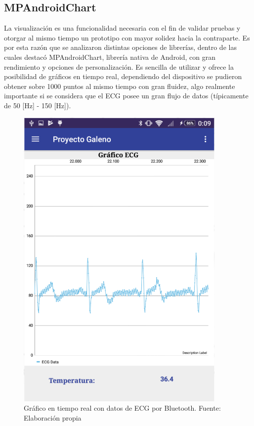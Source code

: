 \subsection{MPAndroidChart}

La visualización es una funcionalidad necesaria con el fin de validar pruebas y otorgar al mismo tiempo un prototipo con mayor solidez hacia la contraparte. Es por esta razón que se analizaron distintas opciones de librerías, dentro de las cuales destacó MPAndroidChart, librería nativa de Android, con gran rendimiento y opciones de personalización. Es sencilla de utilizar y ofrece la posibilidad de gráficos en tiempo real, dependiendo del dispositivo se pudieron obtener sobre 1000 puntos al mismo tiempo con gran fluidez, algo realmente importante si se considera que el ECG posee un gran flujo de datos (típicamente de 50 [Hz] - 150 [Hz]).

\begin{figure}[H]
	\centering
	\includegraphics[scale=1]{figuras/proto1/graph.png}
	\caption{Gráfico en tiempo real con datos de ECG por Bluetooth. Fuente: Elaboración propia}
	\label{graph}
\end{figure}


